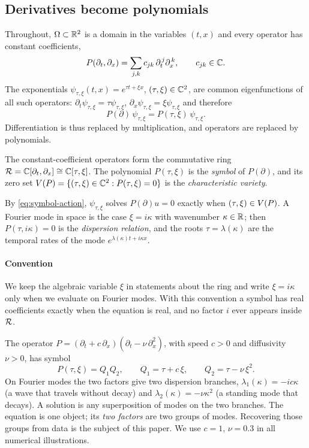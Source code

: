 \subsection{Derivatives become polynomials}\label{sec:ring}
Throughout, $\Omega\subset\mathbb{R}^2$ is a domain in the variables $(t,x)$ and every operator has constant
coefficients,
\[
  P(\partial_t,\partial_x)=\sum_{j,k}c_{jk}\,\partial_t^{\,j}\partial_x^{\,k},\qquad c_{jk}\in\mathbb{C} .
\]
The exponentials $\psi_{\tau,\xi}(t,x)=e^{\tau t+\xi x}$, $(\tau,\xi)\in\mathbb{C}^2$, are common eigenfunctions of
all such operators: $\partial_t \psi_{\tau,\xi}=\tau \psi_{\tau,\xi}$, $\partial_x \psi_{\tau,\xi}=\xi \psi_{\tau,\xi}$ and
therefore
\begin{equation}\label{eq:symbol-action}
  P(\partial)\,\psi_{\tau,\xi}=P(\tau,\xi)\,\psi_{\tau,\xi}.
\end{equation}
Differentiation is thus replaced by multiplication, and operators are replaced by polynomials.

\begin{definition}\label{def:ring}
The constant-coefficient operators form the commutative ring
$\mathcal{R}=\mathbb{C}[\partial_t,\partial_x]\cong\mathbb{C}[\tau,\xi]$. The polynomial $P(\tau,\xi)$ is the \emph{symbol} of
$P(\partial)$, and its zero set $V(P)=\{(\tau,\xi)\in\mathbb{C}^2:P(\tau,\xi)=0\}$ is the
\emph{characteristic variety}.
\end{definition}

By \eqref{eq:symbol-action}, $\psi_{\tau,\xi}$ solves $P(\partial)u=0$ exactly when $(\tau,\xi)\in V(P)$.
A Fourier mode in space is the case $\xi=i\kappa$ with wavenumber $\kappa\in\mathbb{R}$; then
$P(\tau,i\kappa)=0$ is the \emph{dispersion relation}, and the roots $\tau=\lambda(\kappa)$ are the
temporal rates of the mode $e^{\lambda(\kappa)t+i\kappa x}$.

\paragraph{Convention}
We keep the algebraic variable $\xi$ in statements about the ring and write $\xi=i\kappa$ only when we
evaluate on Fourier modes. With this convention a symbol has real coefficients exactly when the
equation is real, and no factor $i$ ever appears inside $\mathcal{R}$.

\begin{example}\label{ex:tpd}
The operator $P=(\partial_t+c\,\partial_x)(\partial_t-\nu\,\partial_x^2)$, with speed $c>0$ and diffusivity
$\nu>0$, has symbol
\[
  P(\tau,\xi)=Q_1Q_2,\qquad Q_1=\tau+c\,\xi,\qquad Q_2=\tau-\nu\,\xi^2 .
\]
On Fourier modes the two factors give two dispersion branches, $\lambda_1(\kappa)=-ic\kappa$ (a
wave that travels without decay) and $\lambda_2(\kappa)=-\nu\kappa^2$ (a standing mode that decays).
A solution is any superposition of modes on the two branches. The equation is one object; its
\emph{two factors} are two groups of modes. Recovering those groups from data is the subject of this
paper. We use $c=1$, $\nu=0.3$ in all numerical illustrations.
\end{example}

